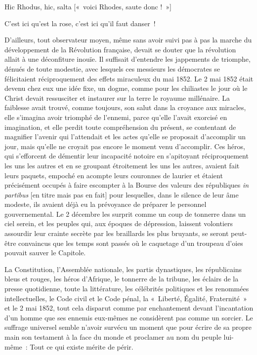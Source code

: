 \documentclass[french,twoside]{book} %
\newenvironment{quoteblock}%
  {\begin{quoting}}
  {\end{quoting}}
\newenvironment{quotebar}{%
    \def\FrameCommand{{\color{rubric!10!}\vrule width 0.5em} \hspace{0.9em}}%
    \def\OuterFrameSep{\itemsep} %
    \MakeFramed {\advance\hsize-\width \FrameRestore}
  }%
  {%
    \endMakeFramed
  }
\renewenvironment{quoteblock}%
  {%
    \savenotes
    \setstretch{0.9}
    \normalfont
    \begin{quotebar}
  }
  {%
    \end{quotebar}
    \spewnotes
  }
\begin{document}
\begin{quoteblock}
 \noindent Hic Rhodus, hic, salta [« voici Rhodes, saute donc ! »]\par
 C’est ici qu’est la rose, c’est ici qu’il faut danser !
 \end{quoteblock}

\noindent D’ailleurs, tout observateur moyen, même sans avoir suivi pas à pas la marche du développement de la Révolution française, devait se douter que la révolution allait à une déconfiture inouïe. Il suffisait d’entendre les jappements de triomphe, dénués de toute modestie, avec lesquels ces messieurs les démocrates se félicitaient réciproquement des effets miraculeux du mai 1852. Le 2 mai 1852 était devenu chez eux une idée fixe, un dogme, comme pour les chiliastes le jour où le Christ devait ressusciter et instaurer sur la terre le royaume millénaire. La faiblesse avait trouvé, comme toujours, son salut dans la croyance aux miracles, elle s’imagina avoir triomphé de l’ennemi, parce qu’elle l’avait exorcisé en imagination, et elle perdit toute compréhension du présent, se contentant de magnifier l’avenir qui l’attendait et les actes qu’elle se proposait d’accomplir un jour, mais qu’elle ne croyait pas encore le moment venu d’accomplir. Ces héros, qui s’efforcent de démentir leur incapacité notoire en s’apitoyant réciproquement les uns les autres et en se groupant étroitement les uns les autres, avaient fait leurs paquets, empoché en acompte leurs couronnes de laurier et étaient précisément occupés à faire escompter à la Bourse des valeurs des républiques \emph{in partibus} [en titre mais pas en fait] pour lesquelles, dans le silence de leur âme modeste, ils avaient déjà eu la prévoyance de préparer le personnel gouvernemental. Le 2 décembre les surprit comme un coup de tonnerre dans un ciel serein, et les peuples qui, aux époques de dépression, laissent volontiers assourdir leur crainte secrète par les braillards les plus bruyants, se seront peut-être convaincus que les temps sont passés où le caquetage d’un troupeau d’oies pouvait sauver le Capitole.\par
La Constitution, l’Assemblée nationale, les partis dynastiques, les républicains bleus et rouges, les héros d’Afrique, le tonnerre de la tribune, les éclairs de la presse quotidienne, toute la littérature, les célébrités politiques et les renommées intellectuelles, le Code civil et le Code pénal, la « Liberté, Égalité, Fraternité » et le 2 mai 1852, tout cela disparut comme par enchantement devant l’incantation d’un homme que ses ennemis eux-mêmes ne considèrent pas comme un sorcier. Le suffrage universel semble n’avoir survécu un moment que pour écrire de sa propre main son testament à la face du monde et proclamer au nom du peuple lui-même : Tout ce qui existe mérite de périr.\par
\end{document}
